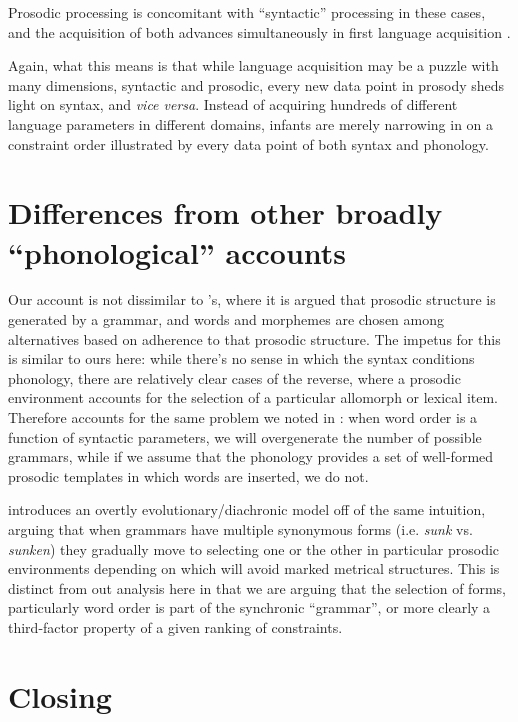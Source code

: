 \documentclass{article}
\begin{document}
Prosodic processing is concomitant with ``syntactic'' processing in these cases, and the acquisition of both advances simultaneously in first language acquisition \parencite{mannel11}.

Again, what this means is that while language acquisition may be a puzzle with many dimensions, syntactic and prosodic, every new data point in prosody sheds light on syntax, and \textit{vice versa}.
Instead of acquiring hundreds of different language parameters in different domains, infants are merely narrowing in on a constraint order illustrated by every data point of both syntax and phonology.

\section{Differences from other broadly ``phonological'' accounts}



Our account is not dissimilar to \textcite{hammond11}'s, where it is argued that prosodic structure is generated by a grammar, and words and morphemes are chosen among alternatives based on adherence to that prosodic structure.
The impetus for this is similar to ours here: while there's no sense in which the syntax conditions phonology, there are relatively clear cases of the reverse, where a prosodic environment accounts for the selection of a particular allomorph or lexical item.
Therefore \textcite{hammond11} accounts for the same problem we noted in \textcite{halle87}: when word order is a function of syntactic parameters, we will overgenerate the number of possible grammars, while if we assume that the phonology provides a set of well-formed prosodic templates in which words are inserted, we do not.

\textcite{schluter15} introduces an overtly evolutionary/diachronic model off of the same intuition, arguing that when grammars have multiple synonymous forms (i.e. \emph{sunk} vs. \emph{sunken}) they gradually move to selecting one or the other in particular prosodic environments depending on which will avoid marked metrical structures.
This is distinct from out analysis here in that we are arguing that the selection of forms, particularly word order is part of the synchronic ``grammar'', or more clearly a third-factor property of a given ranking of constraints.


\section{Closing}
\end{document}
